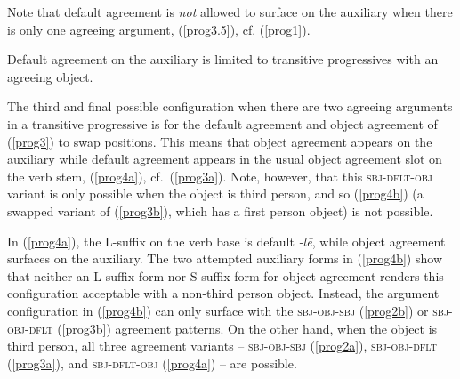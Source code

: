 \documentclass[output=paper
,modfonts
,nonflat]{langsci/langscibook}
\begin{document}
\noindent Note that default agreement is \textit{not} allowed to surface on the auxiliary when there is only one agreeing argument, (\ref{prog3.5}), cf. (\ref{prog1}).

\eal \label{prog3.5}
\zl

\noindent Default agreement on the auxiliary is limited to transitive progressives with an agreeing object.

The third and final possible configuration when there are two agreeing arguments in a transitive progressive is for the default agreement and object agreement of (\ref{prog3}) to swap positions. This means that object agreement appears on the auxiliary while default agreement appears in the usual object agreement slot on the verb stem, (\ref{prog4a}), cf.~(\ref{prog3a}). Note, however, that this \textsc{sbj-dflt-obj} variant is only possible when the object is third person, and so (\ref{prog4b}) (a swapped variant of (\ref{prog3b}), which has a first person object) is not possible.

\eal \label{prog4}
\zl

\noindent In (\ref{prog4a}), the L-suffix on the verb base is default \textit{-l\=e}, while object agreement surfaces on the auxiliary. The two attempted auxiliary forms in (\ref{prog4b}) show that neither an L-suffix form nor S-suffix form for object agreement renders this configuration acceptable with a non-third person object. Instead, the argument configuration in (\ref{prog4b}) can only surface with the \textsc{sbj-obj-sbj} (\ref{prog2b}) or \textsc{sbj-obj-dflt} (\ref{prog3b}) agreement patterns. On the other hand, when the object is third person, all three agreement variants -- \textsc{sbj-obj-sbj} (\ref{prog2a}), \textsc{sbj-obj-dflt} (\ref{prog3a}), and \textsc{sbj-dflt-obj} (\ref{prog4a}) -- are possible.
\end{document}

